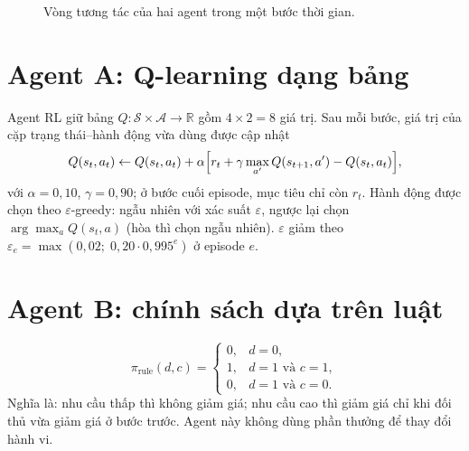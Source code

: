 \documentclass[12pt,a4paper]{report}
\begin{document}
\begin{figure}[H]
\centering
{}
\caption{Vòng tương tác của hai agent trong một bước thời gian.}
\label{fig:loop}
\end{figure}

\section{Agent A: Q-learning dạng bảng}
Agent RL giữ bảng $Q:\mathcal S\times\mathcal A\to\mathbb R$ gồm $4\times2=8$ giá trị.
Sau mỗi bước, giá trị của cặp trạng thái--hành động vừa dùng được cập nhật
\begin{equation}
Q(s_t,a_t)\leftarrow Q(s_t,a_t)+\alpha\Bigl[r_t+\gamma\max_{a'}Q(s_{t+1},a')-Q(s_t,a_t)\Bigr],
\label{eq:q}
\end{equation}
với $\alpha=0{,}10$, $\gamma=0{,}90$; ở bước cuối episode, mục tiêu chỉ còn $r_t$.
Hành động được chọn theo $\varepsilon$-greedy: ngẫu nhiên với xác suất
$\varepsilon$, ngược lại chọn $\arg\max_aQ(s_t,a)$ (hòa thì chọn ngẫu nhiên).
$\varepsilon$ giảm theo $\varepsilon_e=\max(0{,}02;\;0{,}20\cdot0{,}995^{e})$ ở episode $e$.

\section{Agent B: chính sách dựa trên luật}
\begin{equation}
\pi_{\text{rule}}(d,c)=\begin{cases}0,& d=0,\\ 1,& d=1\text{ và }c=1,\\ 0,& d=1\text{ và }c=0.\end{cases}
\end{equation}
Nghĩa là: nhu cầu thấp thì không giảm giá; nhu cầu cao thì giảm giá chỉ khi đối thủ
vừa giảm giá ở bước trước. Agent này không dùng phần thưởng để thay đổi hành vi.
\end{document}
